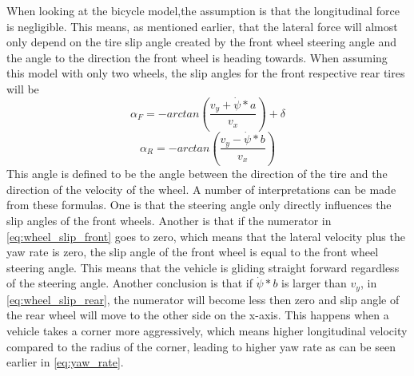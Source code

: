 When looking at the bicycle model,the assumption is that the longitudinal force is negligible. This means, as mentioned earlier, that the lateral force will almost only depend on the tire slip angle created by the front wheel steering angle and the angle to the direction the front wheel is heading towards. When assuming this model with only two wheels, the slip angles for the front respective rear tires will be
\begin{equation} \label{eq:wheel_slip_front}
	\alpha _{F} = -arctan(\dfrac{v_{y} + \dot \psi *a}{v_{x}}) + \delta
\end{equation}
\begin{equation} \label{eq:wheel_slip_rear}
\alpha _{R} = -arctan(\dfrac{v_{y} - \dot \psi *b}{v_{x}})
\end{equation}
This angle is defined to be the angle between the direction of the tire and the direction of the velocity of the wheel. A number of interpretations can be made from these formulas. One is that the steering angle only directly influences the slip angles of the front wheels. Another is that if the numerator in \ref{eq:wheel_slip_front} goes to zero, which means that the lateral velocity plus the yaw rate is zero, the slip angle of the front wheel is equal to the front wheel steering angle. This means that the vehicle is gliding straight forward regardless of the steering angle. Another conclusion is that if $ \dot \psi *b $ is larger than $ v_{y} $, in \ref{eq:wheel_slip_rear}, the numerator will become less then zero and slip angle of the rear wheel will move to the other side on the x-axis. This happens when a vehicle takes a corner more aggressively, which means higher longitudinal velocity compared to the radius of the corner, leading to higher yaw rate as can be seen earlier in \ref{eq:yaw_rate}.

